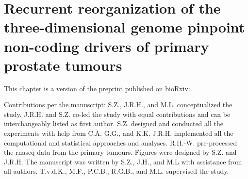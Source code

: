\chapter{Recurrent reorganization of the three-dimensional genome pinpoint non-coding drivers of primary prostate tumours}
\label{chap:3D}

This chapter is a version of the preprint published on bioRxiv:


\vspace{1em}

Contributions per the manuscript:
S.Z., J.R.H., and M.L. conceptualized the study.
J.R.H. and S.Z. co-led the study with equal contributions and can be interchangeably listed as first author.
S.Z. designed and conducted all the experiments with help from C.A. G.G., and K.K.
J.R.H. implemented all the computational and statistical approaches and analyses.
R.H.-W. pre-processed the \gls{rnaseq} data from the primary tumours.
Figures were designed by S.Z. and J.R.H.
The manuscript was written by S.Z., J.H., and M.L with assistance from all authors.
T.v.d.K., M.F., P.C.B., R.G.B., and M.L. supervised the study.






